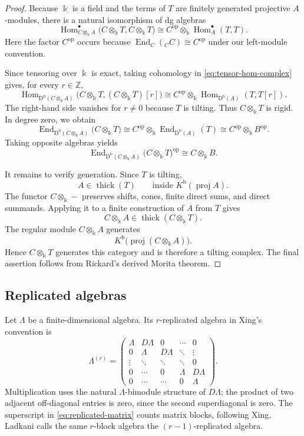 \documentclass[12pt,a4paper,english,reqno]{amsart}
\theoremstyle{plain}
\theoremstyle{definition}
\newcommand{\kk}{\Bbbk}
\newcommand{\Db}{\mathrm D^{\mathrm b}}
\newcommand{\Hom}{\operatorname{Hom}}
\newcommand{\End}{\operatorname{End}}
\newcommand{\thick}{\operatorname{thick}}
\newcommand{\op}{\mathrm{op}}
\begin{document}
\begin{proof}
Because $\kk$ is a field and the terms of $T$ are finitely generated
projective $A$-modules, there is a natural isomorphism of dg algebras
\begin{equation}
 \Hom^\bullet_{C\otimes_{\kk}A}
 \bigl(C\otimes_{\kk}T,C\otimes_{\kk}T\bigr)
 \cong
 C^{\op}\otimes_{\kk}\Hom^\bullet_A(T,T).
\label{eq:tensor-hom-complex}
\end{equation}
Here the factor $C^{\op}$ occurs because
$\End_C({}_CC)\cong C^{\op}$ under our left-module convention.

Since tensoring over $\kk$ is exact, taking cohomology in
\eqref{eq:tensor-hom-complex} gives, for every $r\in\mathbb Z$,
\[
 \Hom_{\Db(C\otimes_{\kk}A)}
 \bigl(C\otimes_{\kk}T,(C\otimes_{\kk}T)[r]\bigr)
 \cong
 C^{\op}\otimes_{\kk}
 \Hom_{\Db(A)}(T,T[r]).
\]
The right-hand side vanishes for $r\neq0$ because $T$ is tilting.
Thus $C\otimes_{\kk}T$ is rigid.  In degree zero, we obtain
\[
 \End_{\Db(C\otimes_{\kk}A)}
 \bigl(C\otimes_{\kk}T\bigr)
 \cong
 C^{\op}\otimes_{\kk}\End_{\Db(A)}(T)
 \cong
 C^{\op}\otimes_{\kk}B^{\op}.
\]
Taking opposite algebras yields
\[
 \End_{\Db(C\otimes_{\kk}A)}
 \bigl(C\otimes_{\kk}T\bigr)^{\op}
 \cong
 C\otimes_{\kk}B.
\]

It remains to verify generation.  Since $T$ is tilting,
\[
 A\in\thick(T)
 \qquad\text{inside }
 K^{\mathrm b}(\operatorname{proj}A).
\]
The functor $C\otimes_{\kk}-$ preserves shifts, cones, finite direct
sums, and direct summands.  Applying it to a finite construction of $A$
from $T$ gives
\[
 C\otimes_{\kk}A
 \in
 \thick(C\otimes_{\kk}T).
\]
The regular module $C\otimes_{\kk}A$ generates
\[
 K^{\mathrm b}
 \bigl(\operatorname{proj}(C\otimes_{\kk}A)\bigr).
\]
Hence $C\otimes_{\kk}T$ generates this category and is therefore a
tilting complex.  The final assertion follows from Rickard's derived
Morita theorem.
\end{proof}

\subsection{Replicated algebras}

Let $\Lambda$ be a finite-dimensional algebra.  Its $r$-replicated
algebra in Xing's convention is
\begin{equation}
 \Lambda^{(r)}
 =
 \begin{pmatrix}
  \Lambda&D\Lambda&0&\cdots&0\\
  0&\Lambda&D\Lambda&\ddots&\vdots\\
  \vdots&\ddots&\ddots&\ddots&0\\
  0&\cdots&0&\Lambda&D\Lambda\\
  0&\cdots&\cdots&0&\Lambda
 \end{pmatrix}.
\label{eq:replicated-matrix}
\end{equation}
Multiplication uses the natural $\Lambda$-bimodule structure of
$D\Lambda$; the product of two adjacent off-diagonal entries is zero,
since the second superdiagonal is zero.  The superscript in
\eqref{eq:replicated-matrix} counts matrix blocks, following Xing.
Ladkani calls the same $r$-block algebra the $(r-1)$-replicated algebra.
\end{document}
